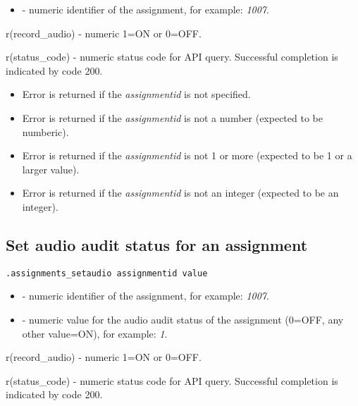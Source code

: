 \paramsheader
\begin{itemize}
    \item {} - numeric identifier of the assignment, for example: \textit{1007}.
\end{itemize}

\savedres
\begin{compactitem}
    \item r(record\_audio) - numeric 1=ON or 0=OFF.
    \item r(status\_code)  - numeric status code for API query. Successful completion is indicated by code 200.
\end{compactitem}

\errheader
\begin{itemize}
    \item Error  is returned if the \textit{assignmentid} is not specified.
    \item Error  is returned if the \textit{assignmentid} is not a number (expected to be numberic).
    \item Error  is returned if the \textit{assignmentid} is not 1 or more (expected to be 1 or a larger value).
    \item Error  is returned if the \textit{assignmentid} is not an integer (expected to be an integer).
\end{itemize}

\subsection{Set audio audit status for an assignment}

\begin{lstlisting}[style=CommandLineStyle]
.assignments_setaudio assignmentid value
\end{lstlisting}

\paramsheader
\begin{itemize}
    \item {} - numeric identifier of the assignment, for example: \textit{1007}.
    \item {} - numeric value for the audio audit status of the assignment (0=OFF, any other value=ON), for example: \textit{1}.

\end{itemize}

\savedres
\begin{compactitem}
    \item r(record\_audio) - numeric 1=ON or 0=OFF.
    \item r(status\_code)  - numeric status code for API query. Successful completion is indicated by code 200.
\end{compactitem}

